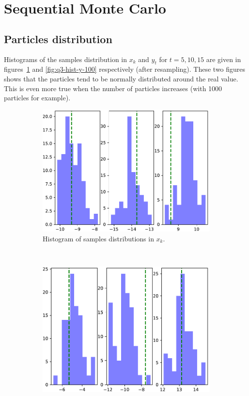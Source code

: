 \documentclass[english, DIV=13]{scrartcl}
\begin{document}
\FloatBarrier

\section{Sequential Monte Carlo}
\subsection{Particles distribution}
Histograms of the samples distribution in $x_k$ and $y_t$ for $t = 5, 10, 15$ are
given in figures~\ref{fig:q3-hist-x-100} and \ref{fig:q3-hist-y-100} respectively
(after resampling). These two figures shows that the particles tend to be normally
distributed around the real value. This is even more true when the number of particles
increases (with 1000 particles for example).

\begin{figure}
    \centering
    \begin{subfigure}{0.49\textwidth}
        \includegraphics[width=\textwidth]{figures/hist-x-100}
        \caption{Histogram of samples distributions in $x_k$.}
        \label{fig:q3-hist-x-100}
    \end{subfigure}%
    ~
    \begin{subfigure}{0.49\textwidth}
        \includegraphics[width=\textwidth]{figures/hist-y-100}

\end{subfigure}
\end{figure}
\end{document}
